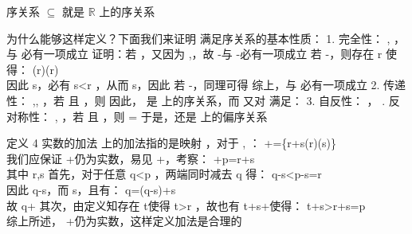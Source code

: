 \begin{definition}{序关系}
$\subseteq$ 就是 $\mathbb{R}$ 上的序关系
\end{definition}
为什么能够这样定义？下面我们来证明 \subseteq  满足序关系的基本性质：
1. 完全性： \forall \alpha,\beta \in{} ， \alpha\subseteq \beta   与 \beta\subseteq \alpha  必有一项成立
证明：若 \alpha\neq\beta ，又因为 \alpha,\beta\neq\emptyset ，故 \alpha-\beta\neq \emptyset 与 \beta-\alpha \neq \emptyset 必有一项成立
若 \alpha-\beta\neq\emptyset ，则存在 r\in{} 使得：
(r\in\alpha)\wedge (r\notin\beta)\\ 
因此 \forall s\in\beta ，必有 s<r ，从而 s\in\alpha ，因此 \beta\subset \alpha 
若 \beta-\alpha\neq\emptyset ，同理可得 \alpha\subset \beta 
综上，\alpha\subseteq \beta   与 \beta\subseteq \alpha  必有一项成立
2. 传递性： \forall \alpha,\beta,\gamma \in {} ，若 \alpha\subseteq\beta 且 \beta\subseteq\gamma ，则 \alpha\subseteq\gamma 
因此， \subseteq 是  上的序关系，而 \subseteq 又对  满足：
3. 自反性： \forall \alpha\in{} ， \alpha\subseteq{}. 反对称性： \forall \alpha,\beta\in{} ，若 \alpha\subseteq\beta 且 \beta\subseteq\alpha ，则 \alpha=\beta 
于是，\subseteq 还是  上的偏序关系

定义 4  实数的加法
 上的加法指的是映射 \times{}\to{} ，对于 \alpha,\beta\in{} ：
 \alpha+\beta=\{r+s\mid(r\in\alpha)\wedge(s\in\beta)\}\\ 
我们应保证 \alpha+\beta 仍为实数，易见 \alpha+\beta\neq \emptyset ，考察：
\alpha+\beta\ni p=r+s\\ 
其中 r\in\alpha,s\in\beta 
首先，对于任意 \ni q<p ，两端同时减去 q 得：
q-s<p-s=r \\ 
因此 q-s\in\alpha，而 s\in\beta ，且有：
q=(q-s)+s\\ 
故 q\in\alpha+\beta 
其次，由定义知存在 t\in\alpha 使得 t>r ，故也有 t+s\in\alpha+\beta 使得：
t+s>r+s=p\\ 
综上所述， \alpha+\beta 仍为实数，这样定义加法是合理的


